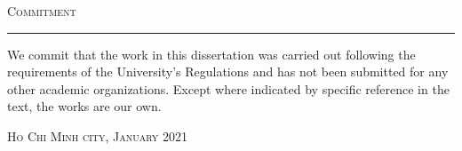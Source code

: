 \thispagestyle{empty}
\vspace*{3cm}
\noindent\Huge\textsc{Commitment}\\
\normalsize
\noindent\rule[2pt]{\textwidth}{0.8pt}
\hspace*{5cm}

We commit that the work in this dissertation was carried out following the requirements of the University’s Regulations and has not been submitted for any other academic organizations. Except where indicated by specific reference in the text, the works are our own.
	
	\hfill \textsc{Ho Chi Minh city, January 2021}
	
\cleardoublepage
